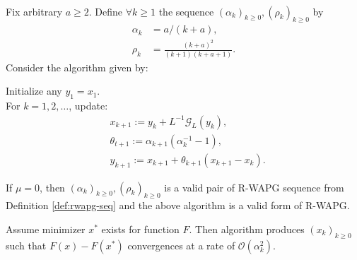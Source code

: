 \documentclass[12pt]{article}
\begin{document}
    \begin{theorem}\label{thm:r-wapg-on-cham-doss}\;\\
        Fix arbitrary $a \ge 2$.
        Define $\forall k \ge 1$ the sequence $(\alpha_k)_{k \ge 0}, (\rho_k)_{k \ge 0}$ by 
        \begin{align*}
            \alpha_k &= a/(k + a), 
            \\
            \rho_k &= \frac{(k + a)^2}{(k + 1)(k + a + 1)}. 
        \end{align*}
        Consider the algorithm given by: 
        \begin{tcolorbox}
            Initialize any $y_1 = x_1$. 
            \\
            For $k = 1, 2, \ldots$, update: 
            \begin{align*}
                & x_{k + 1} := y_k + L^{-1}\mathcal G_L(y_k), 
                \\
                & \theta_{t + 1} := \alpha_{k + 1}(\alpha_k^{-1} - 1),
                \\
                & y_{k + 1} := x_{k + 1} + \theta_{k + 1}(x_{k + 1} - x_k). 
            \end{align*}    
        \end{tcolorbox}
        If $\mu = 0$, then $(\alpha_k)_{k \ge 0}, (\rho_k)_{k \ge 0}$ is a valid pair of R-WAPG sequence from Definition \ref{def:rwapg-seq} and the above algorithm is a valid form of R-WAPG. 
        \par
        Assume minimizer $x^*$ exists for function $F$. 
        Then algorithm produces $(x_k)_{k \ge0}$ such that $F(x) - F(x^*)$ convergences at a rate of $\mathcal O(\alpha_k^2)$. 
    \end{theorem}
\end{document}

